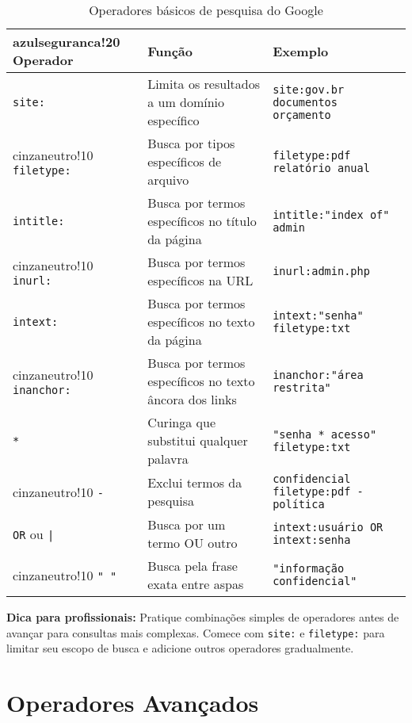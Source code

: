 \documentclass[12pt,a4paper]{book}
\begin{document}
\begin{table}[h]
\centering
\begin{tabular}{|p{2.5cm}|p{6cm}|p{5.5cm}|}
\hline
{azulseguranca!20} \textbf{Operador} & \textbf{Função} & \textbf{Exemplo} \\
\hline
\texttt{site:} & Limita os resultados a um domínio específico & \texttt{site:gov.br documentos orçamento} \\
\hline
{cinzaneutro!10} \texttt{filetype:} & Busca por tipos específicos de arquivo & \texttt{filetype:pdf relatório anual} \\
\hline
\texttt{intitle:} & Busca por termos específicos no título da página & \texttt{intitle:"index of" admin} \\
\hline
{cinzaneutro!10} \texttt{inurl:} & Busca por termos específicos na URL & \texttt{inurl:admin.php} \\
\hline
\texttt{intext:} & Busca por termos específicos no texto da página & \texttt{intext:"senha" filetype:txt} \\
\hline
{cinzaneutro!10} \texttt{inanchor:} & Busca por termos específicos no texto âncora dos links & \texttt{inanchor:"área restrita"} \\
\hline
\texttt{*} & Curinga que substitui qualquer palavra & \texttt{"senha * acesso" filetype:txt} \\
\hline
{cinzaneutro!10} \texttt{-} & Exclui termos da pesquisa & \texttt{confidencial filetype:pdf -política} \\
\hline
\texttt{OR} ou \texttt{|} & Busca por um termo OU outro & \texttt{intext:usuário OR intext:senha} \\
\hline
{cinzaneutro!10} \texttt{" "} & Busca pela frase exata entre aspas & \texttt{"informação confidencial"} \\
\hline
\end{tabular}
\caption{Operadores básicos de pesquisa do Google}
\end{table}

\begin{tipbox}
\textbf{Dica para profissionais:} Pratique combinações simples de operadores antes de avançar para consultas mais complexas. Comece com \texttt{site:} e \texttt{filetype:} para limitar seu escopo de busca e adicione outros operadores gradualmente.
\end{tipbox}

\section{Operadores Avançados}
\end{document}
